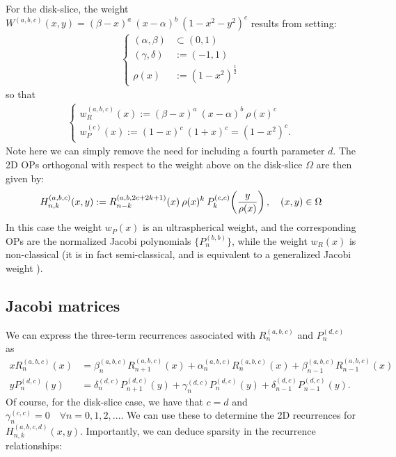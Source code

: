 \documentclass[11pt, oneside]{article}   	%
\newcommand{\bstodo}{\todo[color=pink]}
\newcommand{\half}{\frac{1}{2}}
\newcommand{\R}{\mathbb{R}}
\newcommand{\hdop}{H}
\newcommand{\Wab}{{W^{(a,b)}}}
\newcommand{\jac}{{P}}
\newcommand{\genjac}{R}
\newcommand{\genjacnmk}{\genjac_{n-k}}
\newcommand{\genjacw}{w_\genjac}
\newcommand{\jacw}{w_P}
\newcommand{\hdopnkabc}{\hdop_{n,k}^{(a,b,c)}}
\newcommand{\Wabc}{{W^{(a,b,c)}}}
\newcommand{\hdopnkabcd}{\hdop_{n,k}^{(a,b,c,d)}}
\begin{document}
For the disk-slice, the weight $\Wabc(x,y) = (\beta - x)^a \: (x - \alpha)^b \: (1-x^2-y^2)^c$ results from setting:
\begin{align*}
\begin{cases}
	(\alpha,\beta) &\subset (0,1) \\
	(\gamma,\delta) &:= (-1,1) \\
	\rho(x) &:= (1-x^2)^{\half}
\end{cases}
\end{align*}
so that
\begin{align*}
\begin{cases}
	\genjacw^{(a,b,c)}(x) :=  (\beta - x)^a \: (x - \alpha)^b \: \rho(x)^{c} \\
	\jacw^{(c)}(x) := (1-x)^c \: (1+x)^c = (1-x^2)^c.
\end{cases}
\end{align*}
Note here we can simply remove the need for including a fourth parameter $d$. The 2D OPs orthogonal with respect to the weight above on the disk-slice $\Omega$ are then given by:
\begin{align}\label{eq:diskpolys}
	\hdopnkabc(x,y) := \genjacnmk^{(a, b, 2c+2k+1)}(x) \: \rho(x)^k \: \jac_k^{(c,c)}\fpr(\frac{y}{\rho(x)}), \quad (x,y) \in \Omega
\end{align}
In this case the weight $\jacw(x)$ is an ultraspherical weight, and the corresponding OPs are the normalized Jacobi polynomials $\{\jac_n^{(b, b)}\}$, while the weight $w_R(x)$ is non-classical (it is in fact semi-classical, and is equivalent to a generalized Jacobi weight \cite[\S5]{magnus1995painleve}).



\subsection{Jacobi matrices}

We can express the three-term recurrences associated \bstodo{typo 3}with $\genjac_n^{(a,b,c)}$ and $\jac_n^{(d,c)}$ as 
\begin{align}
	x \genjac_n^{(a,b,c)}(x) &= \beta_n^{(a,b,c)} \genjac_{n+1}^{(a,b,c)}(x) + \alpha_n^{(a,b,c)} \genjac_n^{(a,b,c)}(x) + \beta_{n-1}^{(a,b,c)} \genjac_{n-1}^{(a,b,c)}(x) \label{eqn:Hrecurrence} \\
	y \jac_n^{(d,c)}(y) &= \delta_n^{(d,c)} \jac_{n+1}^{(d,c)}(y) + \gamma_{n}^{(d,c)} \jac_{n}^{(d,c)}(y) + \delta_{n-1}^{(d,c)} \jac_{n-1}^{(d,c)}(y).
\end{align}
Of course, for the disk-slice case, we have that $c = d$ and $\gamma_{n}^{(c,c)} = 0 \quad \forall n=0,1,2,\dots$. We can use these to determine the 2D recurrences for $\hdopnkabcd(x,y)$. Importantly, we can deduce sparsity in the recurrence relationships:
\end{document}
